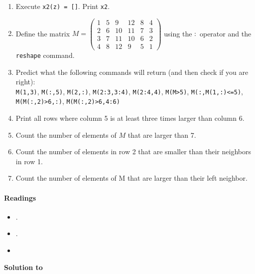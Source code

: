 \begin{enumerate}
	\item Execute \texttt{x2(z) = []}. Print \texttt{x2}.
	\item Define the matrix $M = \begin{pmatrix}
		1&     5&     9&    12&     8&     4\\
		2&     6&    10&    11&     7&     3\\
		3&     7&    11&    10&     6&     2\\
		4&     8&    12&     9&     5&     1 \end{pmatrix}$
		using the $:$ operator and the \texttt{reshape} command.
	\item Predict what the following commands will return (and then check if you are right):\\
	\texttt{M(1,3)},
	\texttt{M(:,5)},
	\texttt{M(2,:)},
	\texttt{M(2:3,3:4)},
	\texttt{M(2:4,4)},
	\texttt{M(M>5)},
	\texttt{M(:,M(1,:)<=5)},
	\texttt{M(M(:,2)>6,:)},
	\texttt{M(M(:,2)>6,4:6)}
	\item Print all rows where column 5 is at least three times larger than column 6.
	\item Count the number of elements of $M$ that are larger than 7.
	\item Count the number of elements in row 2 that are smaller than their neighbors in row 1.
	\item Count the number of elements of M that are larger than their left neighbor.
\end{enumerate}


\paragraph{Readings}
\begin{itemize}
	\item \textcite{Brandimarte_2006_NumericalMethodsFinance}.
	\item \textcite{Miranda.Fackler_2002_AppliedComputationalEconomics}.
	\item \textcite{Pfeifer_2017_MATLABHandout}
\end{itemize}

\begin{solution}\textbf{Solution to }
\ifDisplaySolutions


\fi
\newpage
\end{solution}